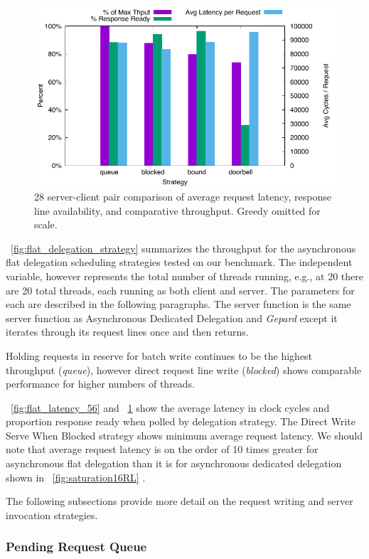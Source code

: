 \documentclass{uicthesi}
\begin{document}
\begin{figure}[ht!]
\centering
\includegraphics[width=0.9\columnwidth]{FIG/flat_latency_28.pdf}
\caption{28 server-client pair comparison of average request latency, response line availability, and comparative throughput. Greedy omitted for scale.}
\label{fig:flat_latency_28}
\end{figure}

~\ref{fig:flat_delegation_strategy} summarizes the throughput for the asynchronous flat delegation scheduling strategies tested on our benchmark. The independent variable, however represents the total number of threads running, e.g., at 20 there are 20 total threads, each running as both client and server. The parameters for each are described in the following paragraphs. The server function is the same server function as Asynchronous Dedicated Delegation and \textit{Gepard} except it iterates through its request lines once and then returns. 

Holding requests in reserve for batch write continues to be the highest throughput (\textit{queue}), however direct request line write (\textit{blocked}) shows comparable performance for higher numbers of threads. 

~\ref{fig:flat_latency_56} and ~\ref{fig:flat_latency_28} show the average latency in clock cycles and proportion response ready when polled by delegation strategy. The Direct Write Serve When Blocked strategy shows minimum average request latency. We should note that average request latency is on the order of 10 times greater for asynchronous flat delegation than it is for asynchronous dedicated delegation shown in ~\ref{fig:saturation16RL} . 

The following subsections provide more detail on the request writing and server invocation strategies. 

\subsubsection{Pending Request Queue}
\end{document}
